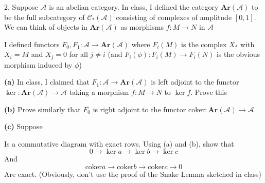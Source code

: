 \documentclass[../main.tex]{subfiles}
\begin{document}
\begin{customexercise}{2.}
Suppose $\mathscr A$ is an abelian category. In class, I defined the category $\mathbf{Ar}(\mathscr A)$ to be the full subcategory of $\mathscr C_*(\mathscr A)$  consisting of complexes of amplitude $[0,1]$. We can think of objects in $\mathbf{Ar}(\mathscr A)$ as morphisms $f:M\to N$ in $\mathscr A$ \par
I defined functors $F_0,F_1:\mathscr A\to\mathbf{Ar}(\mathscr A)$ where $F_i(M)$ is the complex $X_*$ with $X_i=M$ and $X_j=0$ for all $j\neq i$ (and $F_i(\phi):F_i(M)\to F_i(N)$ is the obvious morphism induced by $\phi$) \par
\textbf{(a) }In class, I claimed that $F_1:\mathscr A\to\mathbf{Ar}(\mathscr A)$ is left adjoint to the functor $\ker:\mathbf{Ar}(\mathscr A)\to\mathscr A$ taking a morphism $f:M\to N$ to $\ker f$. Prove this \par
\textbf{(b) }Prove similarly that $F_0$ is right adjoint to the functor $\mathrm{coker}:\mathbf{Ar}(\mathscr A)\to\mathscr A$ \par
\textbf{(c) }Suppose
\begin{center}
\end{center}
Is a commutative diagram with exact rows. Using (a) and (b), show that
\[0\to\ker a\to\ker b\to\ker c\]
 And
 \[\mathrm{coker}a\to\mathrm{coker}b\to\mathrm{coker}c\to0\]
 Are exact. (Obviously, don't use the proof of the Snake Lemma sketched in class)
\end{customexercise}
\end{document}
